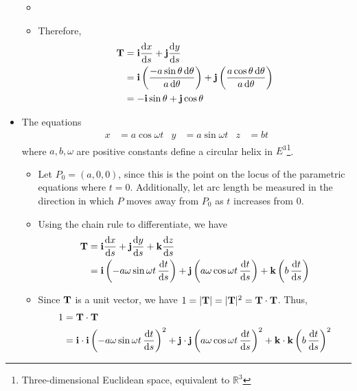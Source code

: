 \documentclass[../main.tex]{subfiles}
\begin{document}
\begin{itemize}
\begin{itemize}
\begin{itemize}
        \end{itemize}
        \item {}
        \item Therefore,
        \begin{align*}
            \vb{T} &= \vb{i}\dv{x}{s}+\vb{j}\dv{y}{s}\\
            &= \vb{i}\left( \frac{-a\sin\theta\dd{\theta}}{a\dd{\theta}} \right)+\vb{j}\left( \frac{a\cos\theta\dd{\theta}}{a\dd{\theta}} \right)\\
            &= -\vb{i}\sin\theta+\vb{j}\cos\theta
        \end{align*}
    \end{itemize}
    \item The equations
    \begin{align*}
        x &= a\cos\omega t&
            y &= a\sin\omega t&
                z &= bt
    \end{align*}
    where $a,b,\omega$ are positive constants define a circular helix in $E^3$\footnote{Three-dimensional Euclidean space, equivalent to $\mathbb{R}^3$}.
    \begin{itemize}
        \item Let $P_0=(a,0,0)$, since this is the point on the locus of the parametric equations where $t=0$. Additionally, let arc length be measured in the direction in which $P$ moves away from $P_0$ as $t$ increases from 0.
        \item Using the chain rule to differentiate, we have
        \begin{align*}
            \vb{T} &= \vb{i}\dv{x}{s}+\vb{j}\dv{y}{s}+\vb{k}\dv{z}{s}\\
            &= \vb{i}\left( -a\omega\sin\omega t\, \dv{t}{s} \right)+\vb{j}\left( a\omega\cos\omega t\, \dv{t}{s} \right)+\vb{k}\left( b\, \dv{t}{s} \right)
        \end{align*}
        \item Since $\vb{T}$ is a unit vector, we have $1=|\vb{T}|=|\vb{T}|^2=\vb{T}\cdot\vb{T}$. Thus,
        \begin{align*}
            1 &= \vb{T}\cdot\vb{T}\\
            &= \vb{i}\cdot\vb{i}\left( -a\omega\sin\omega t\, \dv{t}{s} \right)^2+\vb{j}\cdot\vb{j}\left( a\omega\cos\omega t\, \dv{t}{s} \right)^2+\vb{k}\cdot\vb{k}\left( b\, \dv{t}{s} \right)^2\\

\end{align*}
\end{itemize}
\end{itemize}
\end{document}
